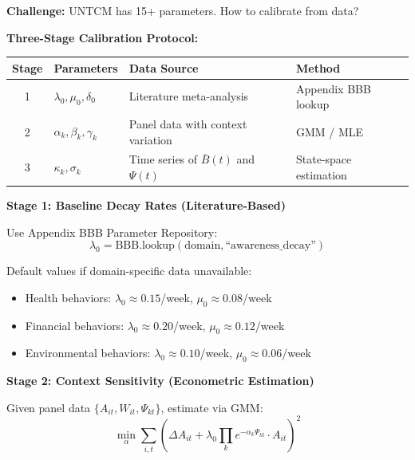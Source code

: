 \begin{tcolorbox}[colback=green!5!white, colframe=green!75!black,
    title=\textbf{Method UNTCM-M2: Parameter Calibration Protocol}]

\textbf{Challenge:} UNTCM has 15+ parameters. How to calibrate from data?

\textbf{Three-Stage Calibration Protocol:}

\begin{center}
\renewcommand{\arraystretch}{1.3}
\begin{tabular}{@{}clll@{}}
\toprule
\textbf{Stage} & \textbf{Parameters} & \textbf{Data Source} & \textbf{Method} \\
\midrule
1 & $\lambda_0, \mu_0, \delta_0$ & Literature meta-analysis & Appendix BBB lookup \\
2 & $\alpha_k, \beta_k, \gamma_k$ & Panel data with context variation & GMM / MLE \\
3 & $\kappa_k, \sigma_k$ & Time series of $\bar{B}(t)$ and $\Psi(t)$ & State-space estimation \\
\bottomrule
\end{tabular}
\end{center}

\textbf{Stage 1: Baseline Decay Rates (Literature-Based)}

Use Appendix BBB Parameter Repository:
\begin{equation}
\lambda_0 = \text{BBB.lookup}(\text{domain}, \text{``awareness\_decay''})
\end{equation}

Default values if domain-specific data unavailable:
\begin{itemize}[nosep]
\item Health behaviors: $\lambda_0 \approx 0.15$/week, $\mu_0 \approx 0.08$/week
\item Financial behaviors: $\lambda_0 \approx 0.20$/week, $\mu_0 \approx 0.12$/week
\item Environmental behaviors: $\lambda_0 \approx 0.10$/week, $\mu_0 \approx 0.06$/week
\end{itemize}

\textbf{Stage 2: Context Sensitivity (Econometric Estimation)}

Given panel data $\{A_{it}, W_{it}, \Psi_{kt}\}$, estimate via GMM:
\begin{equation}
\min_{\alpha} \sum_{i,t} \left( \Delta A_{it} + \lambda_0 \prod_k e^{-\alpha_k \Psi_{kt}} \cdot A_{it} \right)^2
\end{equation}


\end{tcolorbox}
